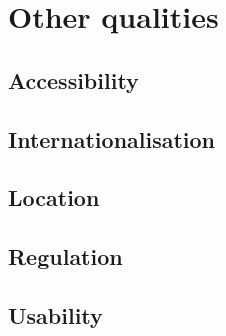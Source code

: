 \section{Other qualities}
\label{sec:other-qualities}

\subsection{Accessibility}
\label{sec:accessibility}


\subsection{Internationalisation}
\label{sec:internationalisation}


\subsection{Location}
\label{sec:location}


\subsection{Regulation}
\label{sec:regulation}


\subsection{Usability}
\label{sec:usability}



